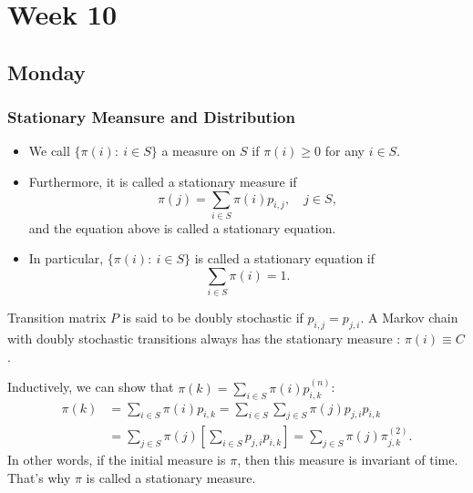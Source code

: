 
\chapter{Week 10}

\section{Monday}
\subsection{Stationary Meansure and Distribution}
\begin{definition}
\begin{itemize}
\item
We call $\{\pi(i):~i\in S\}$ a measure on $S$ if $\pi(i)\ge0$ for any $i\in S$.
\item
Furthermore, it is called a stationary measure if 
\[
\pi(j) = \sum_{i\in S}\pi(i)p_{i,j},\quad j\in S,
\]
and the equation above is called a stationary equation.
\item
In particular, $\{\pi(i):~i\in S\}$ is called a stationary equation if 
\[
\sum_{i\in S}\pi(i)=1.
\]
\end{itemize}
\end{definition}

\begin{example}
Transition matrix $P$ is said to be doubly stochastic if $p_{i,j}=p_{j,i}$.
A Markov chain with doubly stochastic transitions always has the stationary measure
:
$\pi(i)\equiv C$.
\end{example}

\begin{remark}
Inductively, we can show that $\pi(k)=\sum_{i\in S}\pi(i)p_{i,k}^{(n)}$:
\begin{align*}
\pi(k)&=\sum_{i\in S}\pi(i)p_{i,k}=\sum_{i\in S}\sum_{j\in S}\pi(j)p_{j,i}p_{i,k}\\
&=\sum_{j\in S}\pi(j)\left[
\sum_{i\in S}p_{j,i}p_{i,k}
\right]=\sum_{j\in S}\pi(j)\pi_{j,k}^{(2)}.
\end{align*}
In other words, if the initial measure is $\pi$, then this measure is invariant of time.
That's why $\pi$ is called a stationary measure.
\end{remark}

